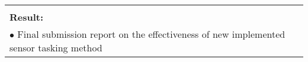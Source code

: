 \begin{table}[!h]
\begin{center}
\begin{tabular}{|p{35mm}||p{55mm}|p{50mm}||p{40mm}|}
      \multicolumn{4}{|p{150mm}|}{}                                                                                                                                                                           \\
      \multicolumn{4}{|p{150mm}|}{\textbf{Result:}}                                                                                                                                                       \\
      \multicolumn{4}{|p{150mm}|}{$\bullet$ Final submission report on the effectiveness of new implemented sensor tasking method}                                                                                                                          \\
      \hline
    \end{tabular}
  \end{center}
\end{table}

\clearpage